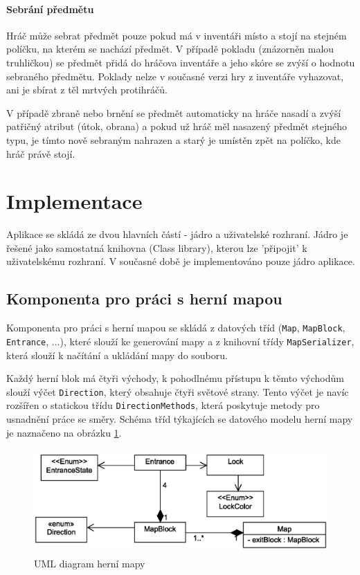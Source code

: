 \documentclass[11pt,a4paper]{scrartcl}
\begin{document}
	\paragraph{Sebrání předmětu} Hráč může sebrat předmět pouze pokud má v inventáři místo a stojí na stejném políčku, na kterém se nachází předmět. V případě pokladu (znázorněn malou truhličkou) se předmět přidá do hráčova inventáře a jeho skóre se zvýší o hodnotu sebraného předmětu. Poklady nelze v současné verzi hry z inventáře vyhazovat, ani je sbírat z těl mrtvých protihráčů.
	
	V případě zbraně nebo brnění se předmět automaticky na hráče nasadí a zvýší patřičný atribut (útok, obrana) a pokud už hráč měl nasazený předmět stejného typu, je tímto nově sebraným nahrazen a starý je umístěn zpět na políčko, kde hráč právě stojí.
	
	\section{Implementace}
	
	Aplikace se skládá ze dvou hlavních částí - jádro a uživatelské rozhraní. Jádro je řešené jako samostatná knihovna (Class library), kterou lze 'připojit' k uživatelskému rozhraní. V současné době je implementováno pouze jádro aplikace.
	
	\subsection{Komponenta pro práci s herní mapou}
	Komponenta pro práci s herní mapou se skládá z datových tříd (\verb|Map|, \verb|MapBlock|, \verb|Entrance|, ...), které slouží ke generování mapy a z knihovní třídy \verb|MapSerializer|, která slouží k načítání a ukládání mapy do souboru.
	
	Každý herní blok má čtyři východy, k pohodlnému přístupu k těmto východům slouží výčet \verb|Direction|, který obsahuje čtyři světové strany. Tento výčet je navíc rozšířen o statickou třídu \verb|DirectionMethods|, která poskytuje metody pro usnadnění práce se směry. Schéma tříd týkajících se datového modelu herní mapy je naznačeno na obrázku \ref{fig:core-map}.
	
	\begin{figure}[H]
		\centering
		\includegraphics[height=40mm]{core-map-simple}
		\caption{UML diagram herní mapy}
		\label{fig:core-map}
	\end{figure}
	
\end{document}
